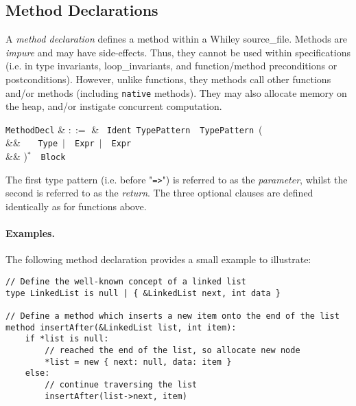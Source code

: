 
\subsection{Method Declarations}
\label{c_source_files_method_decl}

A {\em method declaration} defines a method within a Whiley
\gls{source_file}.  Methods are {\em impure} and may have
side-effects.  Thus, they cannot be used within specifications
(i.e. in type invariants, \gls{loop_invariant}s, and function/method
\gls{precondition}s or \gls{postcondition}s).  However, unlike
functions, they methods call other functions and/or methods (including
\lstinline{native} methods).  They may also allocate memory on the
heap, and/or instigate concurrent computation.

\begin{syntax}
  \verb+MethodDecl+ & $::=$ & \ \verb+Ident+\
  \verb+TypePattern+\ \token{=>}\ \verb+TypePattern+\ \big(\\
  && \ \ \ \verb+Type+\ $|$\ \
  \verb+Expr+\ $|$\ \ \verb+Expr+\\
  && \big)$^*$\ \token{:}\ \verb+Block+\\
\end{syntax}

The first type pattern (i.e. before "\lstinline{=>}") is referred to
as the {\em parameter}, whilst the second is referred to as the {\em
  return}.  The three optional clauses are defined identically as for
functions above.

\paragraph{Examples.}  The following method declaration provides a
small example to illustrate:

\begin{lstlisting}
// Define the well-known concept of a linked list
type LinkedList is null | { &LinkedList next, int data }

// Define a method which inserts a new item onto the end of the list
method insertAfter(&LinkedList list, int item):
    if *list is null:
        // reached the end of the list, so allocate new node
        *list = new { next: null, data: item }
    else:
        // continue traversing the list
        insertAfter(list->next, item)
\end{lstlisting}




